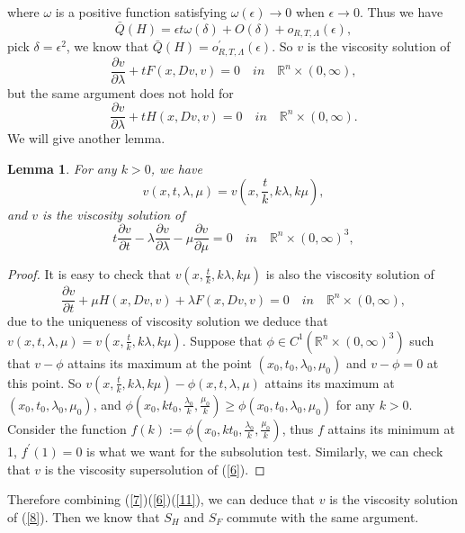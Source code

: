 \documentclass[preprint]{elsarticle}
\newtheorem{lemma}{Lemma}[section]
\numberwithin{equation}{section}
\begin{document}
where $\omega$ is a positive function satisfying $\omega(\epsilon) \rightarrow 0$ when $\epsilon \rightarrow 0$.
Thus we have 
\begin{equation}
    \bar Q(H)=\epsilon t\omega(\delta)+O(\delta)+o_{R,T,\Lambda}(\epsilon),
\end{equation}
pick $\delta=\epsilon^2$, we know that $\bar Q(H)=o_{R,T,\Lambda}^\prime(\epsilon)$.
So $v$ is the viscosity solution of
\begin{equation}
    \frac{\partial v}{\partial \lambda}+tF(x,Dv,v)=0 \quad in \quad\mathbb R^n \times (0,\infty),\label{7}
\end{equation}
but the same argument does not hold for
\begin{equation}
    \frac{\partial v}{\partial \lambda}+tH(x,Dv,v)=0 \quad in \quad\mathbb R^n \times (0,\infty).\label{8}
\end{equation}
We will give another lemma.
\begin{lemma}
    For any $k>0$, we have 
    \begin{equation}
        v(x,t,\lambda,\mu)=v(x,\frac{t}{k},k\lambda,k\mu),
    \end{equation}
    and $v$ is the viscosity solution of 
    \begin{equation}
        t\frac{\partial v}{\partial t}-\lambda\frac{\partial v}{\partial \lambda}-\mu\frac{\partial v}{\partial \mu}=0 \quad in \quad \mathbb R^n\times(0,\infty)^3, \label{6}
    \end{equation}
\end{lemma}
\begin{proof}
    It is easy to check that $v(x,\frac{t}{k},k\lambda,k\mu)$ is also the viscosity solution of 
    \begin{equation}
        \frac{\partial v}{\partial t}+\mu H(x,Dv,v)+\lambda F(x,Dv,v)=0 \quad in \quad \mathbb R^n \times (0,\infty),\label{11}
    \end{equation}
    due to the uniqueness of viscosity solution we deduce that $v(x,t,\lambda,\mu)=v(x,\frac{t}{k},k\lambda,k\mu)$.
    Suppose that $\phi \in C^1(\mathbb R^n \times (0,\infty)^3)$ such that $v-\phi$ attains its maximum at the point $(x_0,t_0,\lambda_0,\mu_0)$ and $v-\phi=0$ at this point. So $v(x,\frac{t}{k},k\lambda,k\mu)-\phi(x,t,\lambda,\mu)$ attains its maximum at $(x_0,t_0,\lambda_0,\mu_0)$, and $\phi(x_0,kt_0,\frac{\lambda_0}{k},\frac{\mu_0}{k})\geq \phi(x_0,t_0,\lambda_0,\mu_0)$ for any $k>0$. Consider the function $f(k):=\phi(x_0,kt_0,\frac{\lambda_0}{k},\frac{\mu_0}{k})$, thus $f$ attains its minimum at 1, $f^\prime(1)=0$ is what we want for the subsolution test. Similarly, we can check that $v$ is the viscosity supersolution of (\ref{6}).
\end{proof}
Therefore combining (\ref{7})(\ref{6})(\ref{11}), we can deduce that $v$ is the viscosity solution of (\ref{8}). Then we know that  $S_H$ and $S_F$ commute with the same argument.
\end{document}
